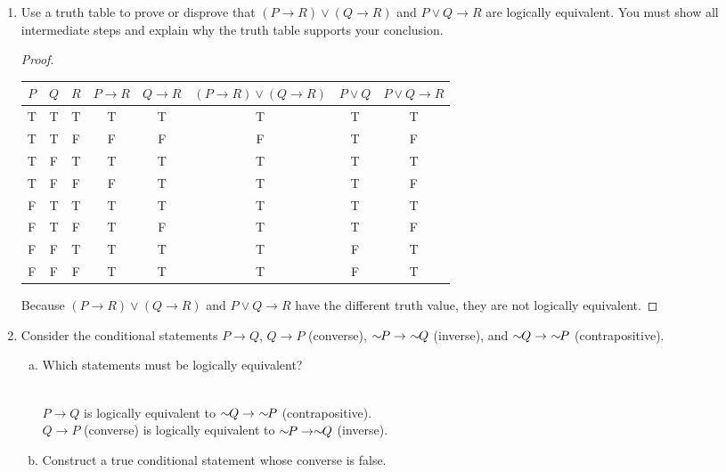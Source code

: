 \documentclass[12pt]{amsart}
\newcommand{\NOT}[1]{\ensuremath{\sim\hspace{-0.05in}#1}}
\begin{document}
\begin{enumerate}[{\bfseries 1.}]
\newpage
\item Use a truth table to prove or disprove that $(P\to R)\lor(Q\to R)$ and $P\lor Q\to R$ are logically equivalent.
	You must show all intermediate steps and explain why the truth table supports your conclusion.
	\vspace{0.1in}
		\begin{proof}
		\ 
		\begin{center}
		\begin{tabular}{c|c|c|c|c|c|c|c}
		$P$ & $Q$ & $R$ & $P \to R$ & $Q \to R$ & $(P \to R) \lor (Q \to R)$ & $P \lor Q$ & $P \lor Q \to R$ \\ \hline
		 T  &  T  &  T  &  T  &  T  &  T  &  T  &  T\\
		 T  &  T  &  F  &  F  &  F  &  F  &  T  &  F\\
		 T  &  F  &  T  &  T  &  T  &  T  &  T  &  T\\
		 T  &  F  &  F  &  F  &  T  &  T  &  T  &  F\\
		 F  &  T  &  T  &  T  &  T  &  T  &  T  &  T\\
		 F  &  T  &  F  &  T  &  F  &  T  &  T  &  F\\
		 F  &  F  &  T  &  T  &  T  &  T  &  F  &  T\\
		 F  &  F  &  F  &  T  &  T  &  T  &  F  &  T
		\end{tabular}
		\end{center}
		\vspace{0.1in}
		Because $(P \to R) \lor (Q \to R)$ and $P \lor Q \to R$ have the different truth value, they are not logically equivalent.
		\end{proof}
\item Consider the conditional statements $P\to Q$, $Q\to P$ (converse), $\NOT{P}\to\ \NOT{Q}$ (inverse), and $\NOT{Q}\to\ \NOT{P}$ (contrapositive).
	\begin{enumerate}[(a)]
	\vspace{0.1in}
	\item Which statements must be logically equivalent?
	\begin{normalize}
	    \vspace{0.1in}
        \\$P\to Q$ is logically equivalent to $\NOT{Q}\to\ \NOT{P}$ (contrapositive).\tab
        \\$Q\to P$ (converse) is logically equivalent to $\NOT{P}\to \NOT{Q}$ (inverse).\tab
        \\
    \end{normalize}
	\item Construct a true conditional statement whose converse is false.

\end{enumerate}
\end{enumerate}
\end{document}
